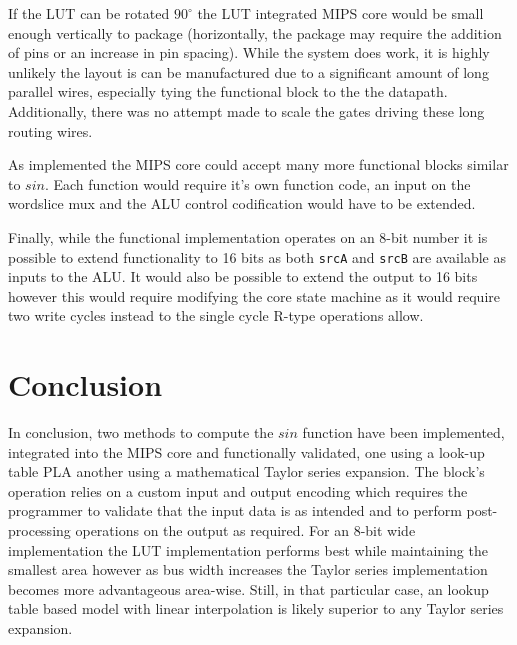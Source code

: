 \documentclass[10pt,journal]{IEEEtran}
\begin{document}
If the LUT can be rotated $90^{\circ}$ the LUT integrated MIPS core would be small enough vertically to package (horizontally, the package may require the addition of pins or an increase in pin spacing). While the system does work, it is highly unlikely the layout is can be manufactured due to a significant amount of long parallel wires, especially tying the functional block to the the datapath. Additionally, there was no attempt made to scale the gates driving these long routing wires.

As implemented the MIPS core could accept many more functional blocks similar to $sin$. Each function would require it's own function code, an input on the wordslice mux and the ALU control codification would have to be extended.

Finally, while the functional implementation operates on an 8-bit number it is possible to extend functionality to 16 bits as both \texttt{srcA} and \texttt{srcB} are available as inputs to the ALU. It would also be possible to extend the output to 16 bits however this would require modifying the core state machine as it would require two write cycles instead to the single cycle R-type operations allow.

\section{Conclusion}
In conclusion, two methods to compute the $sin$ function have been implemented, integrated into the MIPS core and functionally validated, one using a look-up table PLA another using a mathematical Taylor series expansion. The block's operation relies on a custom input and output encoding which requires the programmer to validate that the input data is as intended and to perform post-processing operations on the output as required. For an 8-bit wide implementation the LUT implementation performs best while maintaining the smallest area however as bus width increases the Taylor series implementation becomes more advantageous area-wise. Still, in that particular case, an lookup table based model with linear interpolation is likely superior to any Taylor series expansion.
\end{document}
